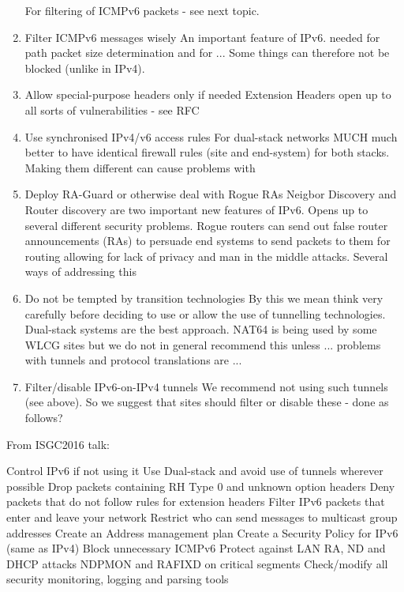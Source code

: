 \begin{enumerate}
For filtering of ICMPv6 packets - see next topic.


\item Filter ICMPv6 messages wisely
An important feature of IPv6. needed for path packet size determination and for ...
Some things can therefore not be blocked (unlike in IPv4).

\item Allow special-purpose headers only if needed
Extension Headers open up to all sorts of vulnerabilities - see RFC

\item Use synchronised IPv4/v6 access rules
For dual-stack networks MUCH much better to have identical firewall rules (site and end-system) for both stacks. Making them different can cause problems with



\item Deploy RA-Guard or otherwise deal with Rogue RAs
Neigbor Discovery and Router discovery are two important new features of IPv6. Opens up to several different security problems. Rogue routers can send out false router announcements (RAs) to persuade end systems to send packets to them for routing allowing for lack of privacy and man in the middle attacks.  Several ways of addressing this


\item Do not be tempted by transition technologies
By this  we mean think very carefully before deciding to use or allow the use of tunnelling technologies.  Dual-stack systems are the best approach. NAT64 is being used by some WLCG sites but we do not in general recommend this unless ...
problems with tunnels and protocol translations are ...

\item Filter/disable IPv6-on-IPv4 tunnels
We recommend not using such tunnels (see above).  So we suggest that sites should filter or disable these - done as follows?


\end{enumerate}

From ISGC2016 talk:

Control IPv6 if not using it
Use Dual-stack and avoid use of tunnels wherever possible
Drop packets containing RH Type 0 and unknown option headers
Deny packets that do not follow rules for extension headers
Filter IPv6 packets that enter and leave your network
Restrict who can send messages to multicast group addresses
Create an Address management plan
Create a Security Policy for IPv6 (same as IPv4)
Block unnecessary ICMPv6
Protect against LAN RA, ND and DHCP attacks
NDPMON and RAFIXD on critical segments
Check/modify all security monitoring, logging and parsing tools



